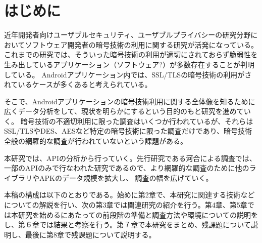\newpage
\section{はじめに} 
近年開発者向けユーザブルセキュリティ、ユーザブルプライバシーの研究分野においてソフトウェア開発者の暗号技術の利用に関する研究が活発になっている。
これまでの研究では、そういった暗号技術の利用が適切にされておらず脆弱性を生み出しているアプリケーション（ソフトウェア?）が多数存在することが判明している。
Androidアプリケーション内では、SSL/TLSの暗号技術の利用がされているケースが多くあると考えられている。

そこで、Androidアプリケーションの暗号技術利用に関する全体像を知るために広くデータ分析をして、現状を明らかにするという目的のもと研究を進めていく。
暗号技術の不適切利用に限った調査はいくつか行われているが、それらはSSL/TLSやDES、AESなど特定の暗号技術に限った調査だけであり、暗号技術全般の網羅的な調査が行われていないという課題がある。

本研究では、APIの分析から行っていく。先行研究である河合による調査では、一部のAPIのみで行なわれた研究であるので、より網羅的な調査のために他のライブラリやAPKのデータ規模を拡大し、
調査の幅を広げていく。

本稿の構成は以下のとおりである。始めに第2章で、本研究に関連する技術などについての解説を行い、次の第3章では関連研究の紹介を行う。第4章、第5章では本研究を始めるにあたっての前段階の準備と調査方法や環境についての説明をし、第６章では結果と考察を行う。第７章で本研究をまとめ、残課題について説明し、最後に第8章で残課題について説明する。